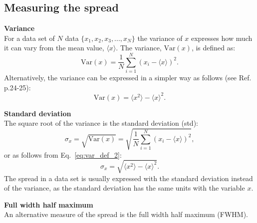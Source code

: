 \subsection{Measuring the spread}\label{app:meas_spread}
\normalsize{\textbf{Variance}}\\
For a data set of $N$ data $\{ x_1, x_2, x_3, ..., x_N \}$ the variance of $x$  expresses how much it can vary from the mean value, $\langle x \rangle$. The variance, $\mathrm{Var}(x)$, is defined as:
\begin{equation}\label{eq:var_def_1}
    \mathrm{Var}(x) = \frac{1}{N} \sum_{i=1}^{N} (x_i-\langle x \rangle)^2.
\end{equation}
Alternatively, the variance can be expressed in a simpler way as follows (see Ref.~\cite{lvp.b313005720130101} p.24-25):
\begin{equation}\label{eq:var_def_2}
    \mathrm{Var}(x) = \langle x^2 \rangle - \langle x \rangle^2.
\end{equation}

\normalsize{\textbf{Standard deviation}}\\
The square root of the variance is the standard deviation (std):
\begin{equation}\label{eq:std_def_1}
    \sigma_x = \sqrt{\mathrm{Var}(x)} = \sqrt{\frac{1}{N} \sum_{i=1}^{N} (x_i-\langle x \rangle)^2},
\end{equation}
or as follows from Eq.~\eqref{eq:var_def_2}:
\begin{equation}\label{eq:std_def_2}
    \sigma_x = \sqrt{\langle x^2 \rangle - \langle x \rangle^2}.
\end{equation}
The spread in a data set is usually expressed with the standard deviation instead of the variance, as the standard deviation has the same units with the variable $x$.


\normalsize{\textbf{Full width half maximum}}\\
An alternative measure of the spread is the full width half maximum (FWHM).


